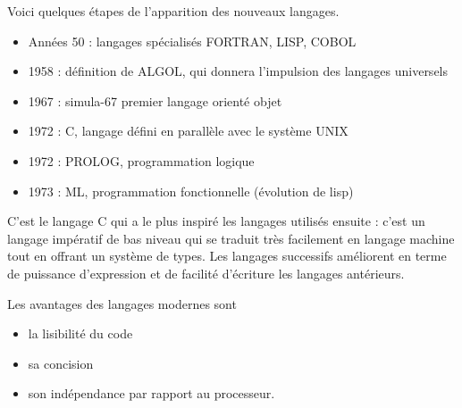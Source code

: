 Voici quelques étapes de l'apparition des nouveaux langages.
\begin{itemize}
\item Années 50 : langages spécialisés FORTRAN, LISP, COBOL 
\item 1958 : définition de ALGOL, qui donnera l'impulsion des langages universels
\item 1967 : simula-67 premier langage orienté objet
\item 1972 : C, langage défini en parallèle avec le système UNIX
\item 1972 : PROLOG, programmation logique
\item 1973 : ML, programmation fonctionnelle (évolution de lisp)
\end{itemize}


C'est le langage C qui a le plus inspiré les langages utilisés ensuite : c'est un langage impératif de bas niveau qui se traduit très facilement en langage machine tout en offrant un système de types. Les langages successifs améliorent en terme de puissance d'expression et de facilité d'écriture les langages antérieurs.

Les avantages des langages modernes sont
\begin{itemize}
\item la lisibilité du code
\item sa concision
\item son indépendance par rapport au processeur.
\end{itemize}
